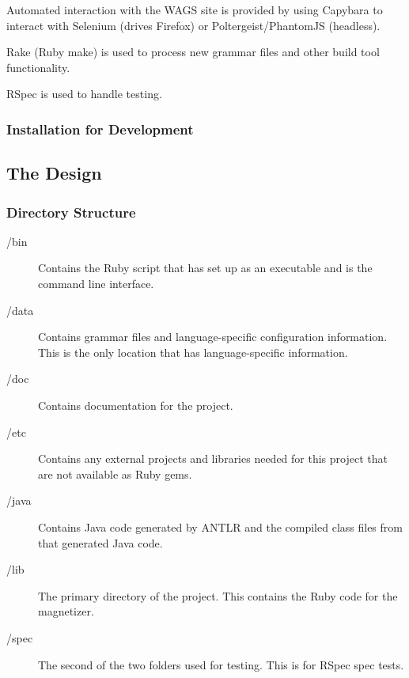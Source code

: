 \documentclass[letter,10pt]{article}
\begin{document}
Automated interaction with the WAGS site is provided by using Capybara 
to interact with Selenium (drives Firefox) or Poltergeist/PhantomJS 
(headless).

Rake (Ruby make) is used to process new grammar files and other build 
tool functionality.

RSpec is used to handle testing.

\subsubsection{Installation for Development}

\subsection{The Design}

\subsubsection{Directory Structure}
\begin{description}
 \item [/bin]
    Contains the Ruby script that has set up as an 
executable and is the command line interface.

 \item [/data]
    Contains grammar files and language-specific 
configuration information. This is the only location that has 
language-specific information.

 \item [/doc]
    Contains documentation for the project.
    
 \item [/etc]
    Contains any external projects and libraries needed for this 
project that are not available as Ruby gems.

 \item [/java]
    Contains Java code generated by ANTLR and the compiled class files 
from that generated Java code.

 \item [/lib]
    The primary directory of the project. This contains the Ruby code 
for the magnetizer.

 \item [/spec]
    The second of the two folders used for testing. This is for RSpec 
spec tests.

\end{description}
\end{document}

